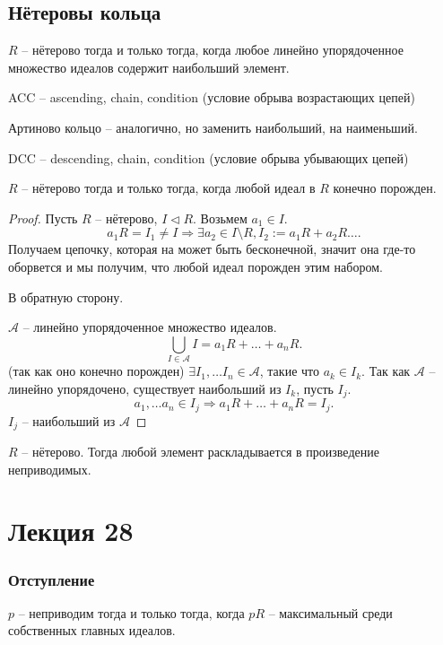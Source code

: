 \documentclass[12pt]{report}
\begin{document}
\subsection{Нётеровы кольца}
\begin{defn}
    $R$ -- нётерово тогда и только тогда, когда любое линейно упорядоченное множество идеалов содержит наибольший элемент.

ACC -- ascending, chain, condition (условие обрыва возрастающих цепей)
\end{defn}
\begin{defn}
Артиново кольцо -- аналогично, но заменить наибольший, на наименьший.

DCC -- descending, chain, condition (условие обрыва убывающих цепей)
\end{defn}
\begin{lm}
    $ R$ -- нётерово тогда и только тогда, когда любой идеал в $ R$ конечно порожден.
\end{lm}
\begin{proof}
    Пусть $ R$ -- нётерово, $ I \triangleleft R$. Возьмем $ a_1 \in  I$. \[
    a_1 R = I_1\ne I \Longrightarrow  \exists  a_2 \in  I \setminus R , I_2 := a_1R + a_2R \ldots  
    .\] 
    Получаем цепочку, которая на может быть бесконечной, значит она где-то оборвется и мы получим, что любой идеал порожден этим набором.
     
    В обратную сторону.

    $ \mathcal{A} $ -- линейно упорядоченное множество идеалов. 
    \[
	\bigcup_{I \in  \mathcal A} I = a_1 R + \ldots  +a_n R
    .\] (так как оно конечно порожден)
    $ \exists  I_1, \ldots I_n \in  \mathcal{A}$, такие что $ a_k \in  I_k$.
    Так как $ \mathcal{A}$ -- линейно упорядочено, существует наибольший из $ I_k$, пусть $ I_j$.
     \[
    a_1, \ldots a_n \in  I_j \Longrightarrow a_1R + \ldots + a_n R = I_j
    .\] 
$ I_j$ -- наибольший из $ \mathcal{A}$
\end{proof}
\begin{thm}
    $ R$ -- нётерово. Тогда любой элемент раскладывается в произведение неприводимых.
\end{thm}
\section{Лекция 28}
\subsubsection{Отступление}
$ p$ -- неприводим тогда и только тогда, когда $ pR$ -- максимальный среди собственных главных идеалов.
\end{document}

